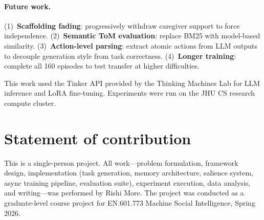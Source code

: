 \documentclass{article}
\begin{document}
\paragraph{Future work.} (1)~\textbf{Scaffolding fading}: progressively withdraw caregiver support to force independence. (2)~\textbf{Semantic ToM evaluation}: replace BM25 with model-based similarity. (3)~\textbf{Action-level parsing}: extract atomic actions from LLM outputs to decouple generation style from task correctness. (4)~\textbf{Longer training}: complete all 160 episodes to test transfer at higher difficulties.

\begin{ack}
This work used the Tinker API provided by the Thinking Machines Lab for LLM inference and LoRA fine-tuning. Experiments were run on the JHU CS research compute cluster.
\end{ack}




\section*{Statement of contribution}

This is a single-person project. All work---problem formulation, framework design, implementation (task generation, memory architecture, salience system, async training pipeline, evaluation suite), experiment execution, data analysis, and writing---was performed by Rishi More. The project was conducted as a graduate-level course project for EN.601.773 Machine Social Intelligence, Spring 2026.
\end{document}
